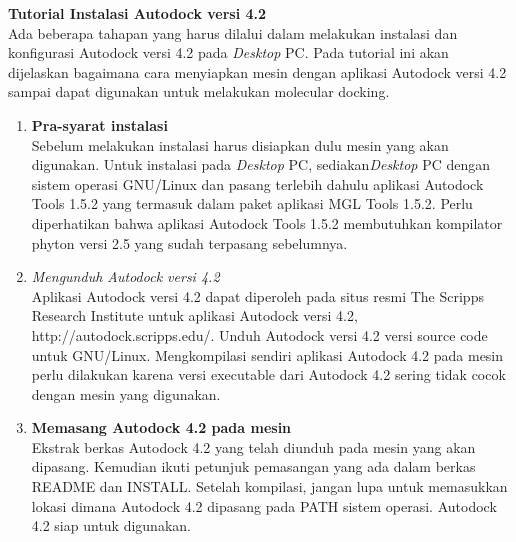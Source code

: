 \textbf{Tutorial Instalasi Autodock versi 4.2} \\ 
Ada beberapa tahapan yang harus dilalui dalam melakukan instalasi dan
konfigurasi Autodock versi 4.2 pada \textit{Desktop} PC. Pada tutorial
ini akan dijelaskan bagaimana cara menyiapkan mesin dengan aplikasi Autodock versi 4.2 sampai dapat digunakan untuk melakukan molecular docking.
\begin{enumerate}
	\item \textbf{Pra-syarat instalasi} \\
	Sebelum melakukan instalasi harus disiapkan dulu mesin yang akan
	digunakan. Untuk instalasi pada \textit{Desktop} PC, sediakan\textit{Desktop} PC dengan sistem operasi GNU/Linux dan pasang terlebih dahulu aplikasi Autodock Tools 1.5.2 yang termasuk dalam paket aplikasi MGL Tools 1.5.2. Perlu diperhatikan bahwa aplikasi Autodock Tools 1.5.2 membutuhkan kompilator phyton versi 2.5 yang sudah terpasang sebelumnya.
	\item \textit{Mengunduh Autodock versi 4.2} \\
	Aplikasi Autodock versi 4.2 dapat diperoleh pada situs resmi The Scripps	Research Institute untuk aplikasi Autodock versi 4.2, http://autodock.scripps.edu/. Unduh Autodock versi 4.2 versi source code untuk GNU/Linux. Mengkompilasi sendiri aplikasi Autodock 4.2 pada mesin perlu dilakukan karena versi executable dari Autodock 4.2 sering tidak cocok dengan mesin yang digunakan.
	\item \textbf{ Memasang Autodock 4.2 pada mesin} \\
	Ekstrak berkas Autodock 4.2 yang telah diunduh pada mesin yang akan dipasang. Kemudian ikuti petunjuk pemasangan yang ada dalam berkas README dan INSTALL. Setelah kompilasi, jangan lupa untuk memasukkan lokasi dimana Autodock 4.2 dipasang pada PATH sistem operasi. Autodock 4.2 siap untuk digunakan.
\end{enumerate}

